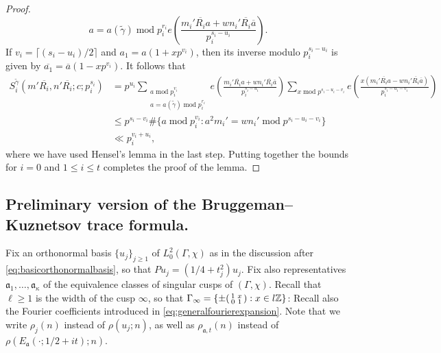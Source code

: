 \documentclass{article}
\theoremstyle{named}
\newcommand{\Z}{\mathbb{Z}}
\renewcommand{\a}{\mathfrak{a}}
\DeclareMathOperator{\modulo}{mod}
\begin{document}
\begin{proof}
\begin{equation*}
{{    a = a(\widetilde{\gamma}) \modulo p_i^{r_i}}} e\left(\frac{m_i' \overline{R_i} a + wn_i' \overline{R_i} \overline{a}}{p_i^{s_i - u_i}}\right).
\end{equation*}
If $v_i = \lceil (s_i - u_i)/2\rceil$ and $a_1 = a(1 + xp^{v_i})$, then its inverse modulo $p_i^{s_i - u_i}$ is given by $\overline{a_1} = \overline{a}(1 - xp^{v_i})$. It follows that 
\begin{equation}
\begin{aligned}
    S^{\tilde{\gamma}}_i(m'\overline{R_i}, n' \overline{R_i}; c; p_i^{s_i}) & = p^{u_i} \sum_{\substack{a \modulo p_i^{v_i}\\
    a = a(\widetilde{\gamma}) \modulo p_i^{r_i}}} e\left(\frac{m_i' \overline{R_i} a + wn_i' \overline{R_i} \overline{a}}{p_i^{s_i - u_i}}\right)\sum_{x \modulo p^{s_i - u_i - v_i}} e\left(\frac{x(m_i'\overline{R_i}a - wn_i'\overline{R_i}\overline{a})}{p_i^{s_i - u_i - v_i}}\right)\\
    & \leq p^{s_i - v_i} \#\{a \modulo p_i^{v_i} : a^2 m_i' = wn_i' \modulo p^{s_i - u_i - v_i}\}\\
    & \ll p_i^{v_i + u_i},
\end{aligned}
\end{equation}
where we have used Hensel's lemma in the last step. Putting together the bounds for $i = 0$ and $1 \leq i \leq t$ completes the proof of the lemma.
\end{proof}

\subsection{Preliminary version of the Bruggeman--Kuznetsov trace formula.}

Fix an orthonormal basis $\{u_j\}_{j \geq 1}$ of $L_0^2(\Gamma, \chi)$ as in the discussion after \eqref{eq:basicorthonormalbasis}, so that $P u_j = (1/4 + t_j^2)u_j$.  Fix also representatives $\a_1, \ldots, \a_\kappa$ of the equivalence classes of singular cusps of $(\Gamma, \chi)$. Recall that $\ell \geq 1$ is the width of the cusp $\infty$, so that $\Gamma_\infty = \{\pm \begin{psmallmatrix}
1 & x\\
0 & 1
\end{psmallmatrix} : x \in l\Z\}$: Recall also the Fourier coefficients introduced in \eqref{eq:generalfourierexpansion}. Note that we write $\rho_j(n)$ instead of $\rho(u_j; n)$, as well as $\rho_{\a, t}(n)$ instead of $\rho(E_\a(\cdot; 1/2 + it); n)$. 
\end{document}
